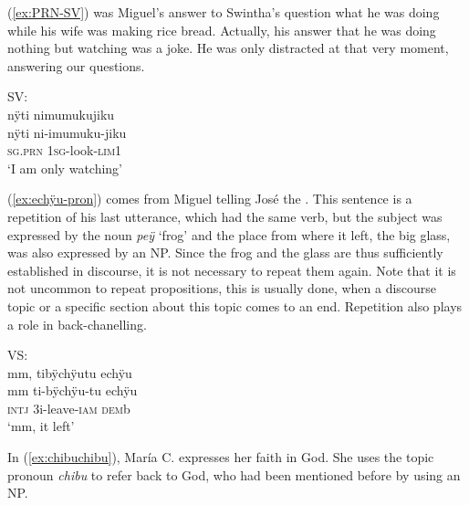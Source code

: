 (\ref{ex:PRN-SV}) was Miguel’s answer to Swintha’s question what he was doing while his wife was making rice bread. Actually, his answer that he was doing nothing but watching was a joke. He was only distracted at that very moment, answering our questions. 

\ea\label{ex:PRN-SV}
\begingl
\glpreamble \textup{SV:}\\nÿti nimumukujiku\\
\gla nÿti ni-imumuku-jiku\\
\textsc{sg.prn} 1\textsc{sg}-look-\textsc{lim}1\\
\glft ‘I am only watching’
\endgl
\trailingcitation{[mxx-e120415ls.071]}
\xe


%

(\ref{ex:echÿu-pron}) comes from Miguel telling José the . This sentence is a repetition of his last utterance, which had the same verb, but the subject was expressed by the noun \textit{peÿ} ‘frog’ and the place from where it left, the big glass, was also expressed by an NP. Since the frog and the glass are thus sufficiently established in discourse, it is not necessary to repeat them again. Note that it is not uncommon to repeat propositions, this is usually done, when a discourse topic or a specific section about this topic comes to an end. Repetition also plays a role in back-chanelling.


\ea\label{ex:echÿu-pron}
\begingl 
\glpreamble \textup{VS:}\\mm, tibÿchÿutu echÿu\\
\gla mm ti-bÿchÿu-tu echÿu\\ 
\glb \textsc{intj} 3i-leave-\textsc{iam} \textsc{dem}b\\ 
\glft ‘mm, it left’ \\ 
\endgl
\trailingcitation{[mox-a110920l-2.026]}
\xe

In (\ref{ex:chibuchibu}), María C. expresses her faith in God. She uses the topic pronoun \textit{chibu} to refer back to God, who had been mentioned before by using an NP.


